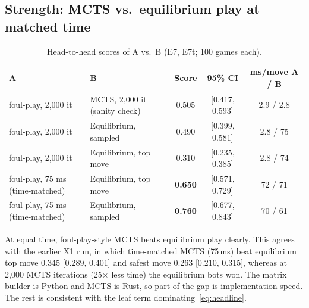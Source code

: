 \documentclass[10pt]{article}
\theoremstyle{plain}
\theoremstyle{definition}
\theoremstyle{remark}
\begin{document}
\subsection{Strength: MCTS vs.\ equilibrium play at matched time}
\label{sec:exp-strength}
\begin{table}[h]
\centering\small
\caption{Head-to-head scores of A vs.\ B (E7, E7t; 100 games each).}
\label{tab:strength}
\begin{tabular}{@{}llccc@{}}
\toprule
A & B & Score & 95\% CI & ms/move A / B \\
\midrule
foul-play, 2,000 it & MCTS, 2,000 it (sanity check) & 0.505 & [0.417, 0.593] & 2.9 / 2.8 \\
foul-play, 2,000 it & Equilibrium, sampled & 0.490 & [0.399, 0.581] & 2.8 / 75 \\
foul-play, 2,000 it & Equilibrium, top move & 0.310 & [0.235, 0.385] & 2.8 / 74 \\
foul-play, 75 ms (time-matched) & Equilibrium, top move & \textbf{0.650} & [0.571, 0.729] & 72 / 71 \\
foul-play, 75 ms (time-matched) & Equilibrium, sampled & \textbf{0.760} & [0.677, 0.843] & 70 / 61 \\
\bottomrule
\end{tabular}
\vspace{-0.6em}
\end{table}
At equal time, foul-play-style MCTS beats equilibrium play clearly. This agrees with the earlier X1 run, in which time-matched MCTS (75\,ms) beat equilibrium top move 0.345 [0.289, 0.401] and safest move 0.263 [0.210, 0.315], whereas at 2,000 MCTS iterations (25$\times$ less time) the equilibrium bots won. The matrix builder is Python and MCTS is Rust, so part of the gap is implementation speed. The rest is consistent with the leaf term dominating~\eqref{eq:headline}.
\end{document}
